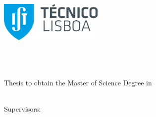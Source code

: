 
\begin{titlepage}
\includegraphics[width=5cm]{images/ist-logo}~\\[1.5cm]
%
%
\begin{center}
{\LARGE \textbf{\Title}}\\[1.5cm]
{\Large \Subtitle}\\[1.5cm]
{\Large \textbf{\StudentName}}\\[1.5cm]
{\large Thesis to obtain the Master of Science Degree in}\\[0.35cm]
{\LARGE \textbf{\DegreeName}}\\[1.5cm]

\begin{minipage}[t]{.32\textwidth}
  \begin{flushright}
    {\large Supervisors:~~}\\
  \end{flushright}
\end{minipage}%
\begin{minipage}[t]{.68\textwidth}
  \begin{flushleft}
    {\large \MainSupervisor \\
     \large \SecondSupervisor}
  \end{flushleft}
\end{minipage}\\[1.5cm]


\end{center}
\end{titlepage}
